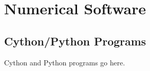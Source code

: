 \chapter{Numerical Software}
\label{cha:numerical_software}

\minitoc
\vspace{10mm}

\section{Cython/Python Programs}
Cython and Python programs go here.
